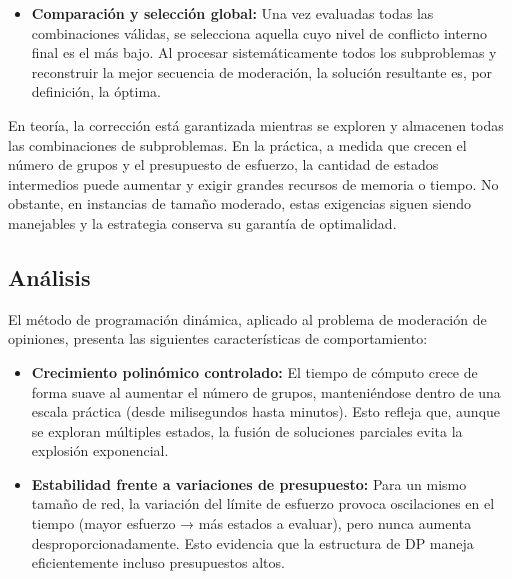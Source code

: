 \documentclass[11pt,letter]{article}
\begin{document}
\begin{itemize}
\begin{itemize}
      \item \textbf{Comparación y selección global:}
      Una vez evaluadas todas las combinaciones válidas, se selecciona aquella cuyo nivel de conflicto interno final es el más bajo. Al procesar sistemáticamente todos los subproblemas y reconstruir la mejor secuencia de moderación, la solución resultante es, por definición, la óptima.

    \end{itemize}



 \vspace{1em}
    \noindent
    \begin{tcolorbox}[colback=red!5!white, colframe=red!50!black, title=Limitaciones Prácticas]
        En teoría, la corrección está garantizada mientras se exploren y almacenen todas las combinaciones de subproblemas. En la práctica, a medida que crecen el número de grupos y el presupuesto de esfuerzo, la cantidad de estados intermedios puede aumentar y exigir grandes recursos de memoria o tiempo. No obstante, en instancias de tamaño moderado, estas exigencias siguen siendo manejables y la estrategia conserva su garantía de optimalidad.
    \end{tcolorbox}
    \subsection{Análisis}

    El método de programación dinámica, aplicado al problema de moderación de opiniones, presenta las siguientes características de comportamiento:

        \begin{itemize}

    \item \textbf{Crecimiento polinómico controlado:}
    El tiempo de cómputo crece de forma suave al aumentar el número de grupos, manteniéndose dentro de una escala práctica (desde milisegundos hasta minutos). Esto refleja que, aunque se exploran múltiples estados, la fusión de soluciones parciales evita la explosión exponencial.


    \item \textbf{Estabilidad frente a variaciones de presupuesto:}
    Para un mismo tamaño de red, la variación del límite de esfuerzo provoca oscilaciones en el tiempo (mayor esfuerzo → más estados a evaluar), pero nunca aumenta desproporcionadamente. Esto evidencia que la estructura de DP maneja eficientemente incluso presupuestos altos.


\end{itemize}
\end{itemize}
\end{document}
